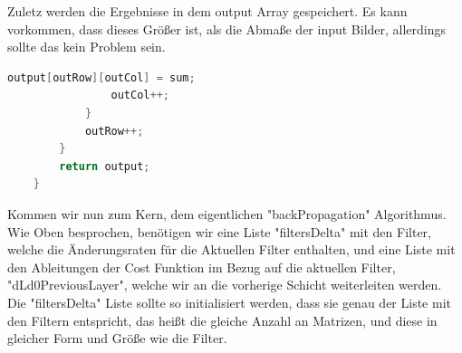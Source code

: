 \documentclass[12pt]{article}
\begin{document}
Zuletz werden die Ergebnisse in dem output Array gespeichert. Es kann vorkommen, dass dieses Größer ist, als die Abmaße der input Bilder, allerdings sollte das kein Problem sein. 
\begin{lstlisting}[language=Java]
                output[outRow][outCol] = sum;
                outCol++;
            }
            outRow++;
        }
        return output;
    }
\end{lstlisting}

Kommen wir nun zum Kern, dem eigentlichen "backPropagation" Algorithmus. Wie Oben besprochen, benötigen wir eine Liste "filtersDelta" mit den Filter, welche die Änderungsraten für die Aktuellen Filter enthalten, und eine Liste mit den Ableitungen der Cost Funktion im Bezug auf die aktuellen Filter, "dLd0PreviousLayer", welche wir an die vorherige Schicht weiterleiten werden.
Die "filtersDelta" Liste sollte so initialisiert werden, dass sie genau der Liste mit den Filtern entspricht, das heißt die gleiche Anzahl an Matrizen, und diese in gleicher Form und Größe wie die Filter.
\end{document}
